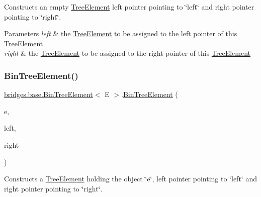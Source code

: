 Constructs an empty \mbox{\hyperlink{classbridges_1_1base_1_1_tree_element}{Tree\+Element}} left pointer pointing to \char`\"{}left\char`\"{} and right pointer pointing to \char`\"{}right\char`\"{}.


\begin{DoxyParams}{Parameters}
{\em left} & the \mbox{\hyperlink{classbridges_1_1base_1_1_tree_element}{Tree\+Element}} to be assigned to the left pointer of this \mbox{\hyperlink{classbridges_1_1base_1_1_tree_element}{Tree\+Element}} \\
\hline
{\em right} & the \mbox{\hyperlink{classbridges_1_1base_1_1_tree_element}{Tree\+Element}} to be assigned to the right pointer of this \mbox{\hyperlink{classbridges_1_1base_1_1_tree_element}{Tree\+Element}} \\
\hline
\end{DoxyParams}
\mbox{\label{classbridges_1_1base_1_1_bin_tree_element_a37f3def3cdf4a9eccf577d0ff3c704e9}} 
\subsubsection{\texorpdfstring{BinTreeElement()}{BinTreeElement()}\hspace{0.1cm}{\footnotesize\ttfamily [5/5]}}
{\footnotesize\ttfamily \mbox{\hyperlink{classbridges_1_1base_1_1_bin_tree_element}{bridges.\+base.\+Bin\+Tree\+Element}}$<$ E $>$.\mbox{\hyperlink{classbridges_1_1base_1_1_bin_tree_element}{Bin\+Tree\+Element}} (\begin{DoxyParamCaption}\item[{E}]{e,  }\item[{\mbox{\hyperlink{classbridges_1_1base_1_1_bin_tree_element}{Bin\+Tree\+Element}}$<$ E $>$}]{left,  }\item[{\mbox{\hyperlink{classbridges_1_1base_1_1_bin_tree_element}{Bin\+Tree\+Element}}$<$ E $>$}]{right }\end{DoxyParamCaption})}

Constructs a \mbox{\hyperlink{classbridges_1_1base_1_1_tree_element}{Tree\+Element}} holding the object \char`\"{}e\char`\"{}, left pointer pointing to \char`\"{}left\char`\"{} and right pointer pointing to \char`\"{}right\char`\"{}.


